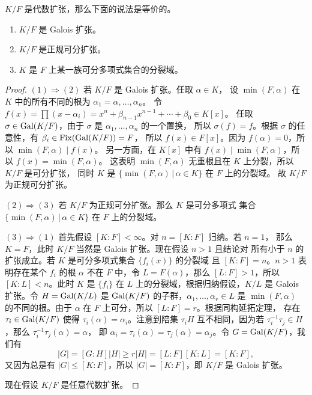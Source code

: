 \begin{theorem}\label{thm:normal separable extension}
  $K/F$ 是代数扩张，那么下面的说法是等价的。
  \begin{enumerate}
    \item $K/F$ 是 Galois 扩张。
    \item $K/F$ 是正规可分扩张。
    \item $K$ 是 $F$ 上某一族可分多项式集合的分裂域。
  \end{enumerate}
\end{theorem}
\begin{proof}
  $(1)\Rightarrow (2)$ 若 $K/F$ 是 Galois 扩张。任取 $\alpha\in K$，
  设 $\min(F,\alpha)$ 在 $K$ 中的所有不同的根为 $\alpha_1=\alpha,\dots,\alpha_n$。
  令 $f(x)=\prod(x-\alpha_i)=x^n+\beta_{n-1}x^{n-1}+\cdots+\beta_0\in K[x]$。
  任取 $\sigma\in\operatorname{Gal}(K/F)$，由于 $\sigma$ 是 $\alpha_1,\dots,\alpha_n$ 的一个置换，
  所以 $\sigma(f)=f$。根据 $\sigma$ 的任意性，有 $\beta_i\in\operatorname{Fix}(\operatorname{Gal}(K/F))=F$，
  所以 $f(x)\in F[x]$。因为 $f(\alpha)=0$，所以 $\min(F,\alpha)\mid f(x)$。
  另一方面，在 $K[x]$ 中有 $f(x)\mid \min(F,\alpha)$，所以 $f(x)=\min(F,\alpha)$。
  这表明 $\min(F,\alpha)$ 无重根且在 $K$ 上分裂，所以 $K/F$ 是可分扩张，
  同时 $K$ 是 $\{\min(F,\alpha)\,|\,\alpha\in K\}$ 在 $F$ 上的分裂域。
  故 $K/F$ 为正规可分扩张。

  $(2)\Rightarrow (3)$ 若 $K/F$ 为正规可分扩张。那么 $K$ 是可分多项式
  集合 $\{\min(F,\alpha)\,|\,\alpha\in K\}$ 在 $F$ 上的分裂域。

  $(3)\Rightarrow (1)$ 首先假设 $[K:F]<\infty$。对 $n=[K:F]$ 归纳。若 $n=1$，
  那么 $K=F$，此时 $K/F$ 当然是 Galois 扩张。现在假设 $n>1$ 且结论对
  所有小于 $n$ 的扩张成立。若 $K$ 是可分多项式集合 $\{f_i(x)\}$ 的分裂域
  且 $[K:F]=n$。$n>1$ 表明存在某个 $f_i$ 的根 $\alpha$ 不在 $F$ 中，令 
  $L=F(\alpha)$，那么 $[L:F]>1$，所以 $[K:L]<n$。此时 $K$ 是 $\{f_i\}$
  在 $L$ 上的分裂域，根据归纳假设，$K/L$ 是 Galois 扩张。令 $H=\operatorname{Gal}(K/L)$
  是 $\operatorname{Gal}(K/F)$ 的子群，$\alpha_1,\dots,\alpha_r\in L$ 是 $\min(F,\alpha)$
  的不同的根。由于 $\alpha$ 在 $F$ 上可分，所以 $[L:F]=r$。根据同构延拓定理，
  存在 $\tau_i\in\operatorname{Gal}(K/F)$ 使得 $\tau_i(\alpha)=\alpha_i$。注意到陪集
  $\tau_iH$ 互不相同，因为若 $\tau_i^{-1}\tau_j\in H$，那么 $\tau_i^{-1}\tau_j(\alpha)=\alpha$，
  即 $\alpha_i=\tau_i(\alpha)=\tau_j(\alpha)=\alpha_j$。令 $G=\operatorname{Gal}(K/F)$，我们有
  \[
    |G|=[G:H]|H|\geq r|H|=[L:F][K:L]=[K:F],
  \]
  又因为总是有 $|G|\leq [K:F]$，所以 $|G|=[K:F]$，即 $K/F$ 是 Galois 扩张。

  现在假设 $K/F$ 是任意代数扩张。
\end{proof}

